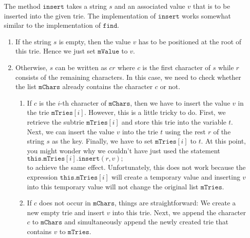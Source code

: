 The method $\texttt{insert}$ takes a string $s$ and an associated value $v$ that is to be inserted
into the given trie.  The implementation of $\texttt{insert}$ works somewhat similar to the
implementation of $\texttt{find}$.
\begin{enumerate}
\item If the string $s$ is empty, then the value $v$ has to be positioned at the root of this trie.
      Hence we just set $\texttt{mValue}$ to $v$.
\item Otherwise, $s$ can be written as $cr$ where $c$ is the first character of $s$ while $r$
      consists of the remaining characters.  In this case, we need to check whether the list
      $\texttt{mChars}$ already contains the character $c$ or not.
      \begin{enumerate}
      \item If $c$ is the $i$-th character of $\texttt{mChars}$, then we have to insert the value $v$
            in the trie $\texttt{mTries}[i]$.  However, this is a little tricky to do.
            First, we retrieve the subtrie $\texttt{mTries}[i]$ and store this trie into the
            variable $t$.  Next, we can insert the value $v$ into the trie $t$ using the rest $r$ of the
            string $s$ as the key.  Finally, we have to set $\texttt{mTries}[i]$ to $t$.  At this point, you
            might wonder why we couldn't have just used the statement
            \\[0.2cm]
            \hspace*{1.3cm}
            $\texttt{this}.\texttt{mTries}[i].\texttt{insert}(r,v)\texttt{;}$
            \\[0.2cm]
            to achieve the same effect. Unfortunately, this does not work because the expression $\texttt{this}.\texttt{mTries}[i]$ will
            create a temporary value and inserting $v$ into this temporary value will not change the
            original list $\texttt{mTries}$.
      \item If $c$ does not occur in $\texttt{mChars}$, things are straightforward: We create a new
            empty trie and insert $v$ into this trie.  Next, we append the character $c$ to
            $\texttt{mChars}$ and simultaneously append the newly created trie that contains $v$ to
            $\texttt{mTries}$. 
      \end{enumerate}
\end{enumerate}

